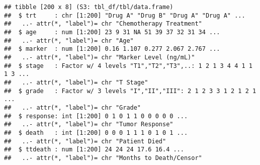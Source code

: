 \documentclass[
]{article}
\begin{document}
\begin{verbatim}
## tibble [200 x 8] (S3: tbl_df/tbl/data.frame)
##  $ trt     : chr [1:200] "Drug A" "Drug B" "Drug A" "Drug A" ...
##   ..- attr(*, "label")= chr "Chemotherapy Treatment"
##  $ age     : num [1:200] 23 9 31 NA 51 39 37 32 31 34 ...
##   ..- attr(*, "label")= chr "Age"
##  $ marker  : num [1:200] 0.16 1.107 0.277 2.067 2.767 ...
##   ..- attr(*, "label")= chr "Marker Level (ng/mL)"
##  $ stage   : Factor w/ 4 levels "T1","T2","T3",..: 1 2 1 3 4 4 1 1 1 3 ...
##   ..- attr(*, "label")= chr "T Stage"
##  $ grade   : Factor w/ 3 levels "I","II","III": 2 1 2 3 3 1 2 1 2 1 ...
##   ..- attr(*, "label")= chr "Grade"
##  $ response: int [1:200] 0 1 0 1 1 0 0 0 0 0 ...
##   ..- attr(*, "label")= chr "Tumor Response"
##  $ death   : int [1:200] 0 0 0 1 1 1 0 1 0 1 ...
##   ..- attr(*, "label")= chr "Patient Died"
##  $ ttdeath : num [1:200] 24 24 24 17.6 16.4 ...
##   ..- attr(*, "label")= chr "Months to Death/Censor"
\end{verbatim}
\end{document}
